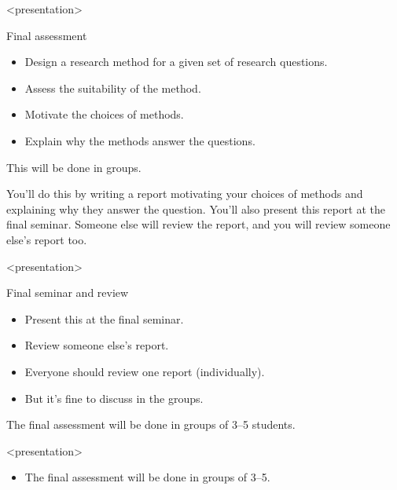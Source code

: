 \begin{frame}<presentation>
  \begin{block}{Final assessment}
    \begin{itemize}
      \item Design a research method for a given set of research questions.
      \item Assess the suitability of the method.
      \item Motivate the choices of methods.
      \item Explain why the methods answer the questions.
    \end{itemize}
  \end{block}

  \begin{remark}
    This will be done in groups.
  \end{remark}
\end{frame}

You'll do this by writing a report motivating your choices of methods and 
explaining why they answer the question.
You'll also present this report at the final seminar.
Someone else will review the report, and you will review someone else's report 
too.

\begin{frame}<presentation>
  \begin{block}{Final seminar and review}
    \begin{itemize}
      \item Present this at the final seminar.
      \item Review someone else's report.
    \end{itemize}
  \end{block}

  \begin{remark}
    \begin{itemize}
      \item Everyone should review one report (individually).
      \item But it's fine to discuss in the groups.
    \end{itemize}
  \end{remark}
\end{frame}

The final assessment will be done in groups of 3--5 students.

\begin{frame}<presentation>
  \begin{remark}
    \begin{itemize}
      \item The final assessment will be done in groups of 3--5.
    \end{itemize}
  \end{remark}
\end{frame}

